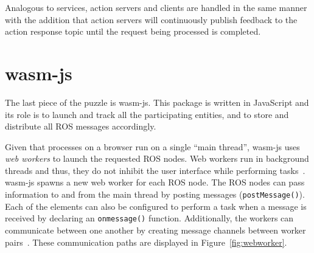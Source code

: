     Analogous to services, action servers and clients are handled in the same manner with the addition that action servers will continuously publish feedback to the action response topic until the request being processed is completed.




\section{wasm-js}\label{sec:wasmjs}

    The last piece of the puzzle is \textsf{wasm-js}. This package is written in JavaScript and its role is to launch and track all the participating entities, and to store and distribute all \ac{ROS} messages accordingly.

    Given that processes on a browser run on a single ``main thread'', \textsf{wasm-js} uses \textit{web workers} to launch the requested \ac{ROS} nodes. Web workers run in background threads and thus, they do not inhibit the user interface while performing tasks~\cite{workers}. \textsf{wasm-js} spawns a new web worker for each \ac{ROS} node. The \ac{ROS} nodes can pass information to and from the main thread by posting messages (\texttt{postMessage()}). Each of the elements can also be configured to perform a task when a message is received by declaring an \texttt{onmessage()} function. Additionally, the workers can communicate between one another by creating message channels between worker pairs~\cite{mgschannel}. These communication paths are displayed in Figure~\ref{fig:webworker}.

